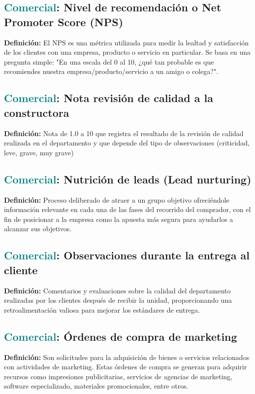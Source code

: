 \documentclass[12pt]{article}
\begin{document}
\subsection{\textcolor{teal}{Comercial}: Nivel de recomendación o Net Promoter Score (NPS)}
\textbf{Definición:} El NPS es una métrica utilizada para medir la lealtad y satisfacción de los clientes con una empresa, producto o servicio en particular. Se basa en una pregunta simple: "En una escala del 0 al 10, ¿qué tan probable es que recomiendes nuestra empresa/producto/servicio a un amigo o colega?".
\subsection{\textcolor{teal}{Comercial}: Nota revisión de calidad a la constructora}
\textbf{Definición:} Nota de 1.0 a 10 que registra el resultado de la revisión de calidad realizada en el departamento y que depende del tipo de observaciones (criticidad, leve, grave, muy grave)
\subsection{\textcolor{teal}{Comercial}: Nutrición de leads (Lead nurturing)}
\textbf{Definición:} Proceso deliberado de atraer a un grupo objetivo ofreciéndole información relevante en cada una de las fases del recorrido del comprador, con el fin de posicionar a la empresa como la apuesta más segura para ayudarlos a alcanzar sus objetivos.
\subsection{\textcolor{teal}{Comercial}: Observaciones durante la entrega al cliente}
\textbf{Definición:} Comentarios y evaluaciones sobre la calidad del departamento realizadas por los clientes después de recibir la unidad, proporcionando una retroalimentación valiosa para mejorar los estándares de entrega.
\subsection{\textcolor{teal}{Comercial}: Órdenes de compra de marketing}
\textbf{Definición:} Son solicitudes para la adquisición de bienes o servicios relacionados con actividades de marketing. Estas órdenes de compra se generan para adquirir recursos como impresiones publicitarias, servicios de agencias de marketing, software especializado, materiales promocionales, entre otros.
\end{document}
